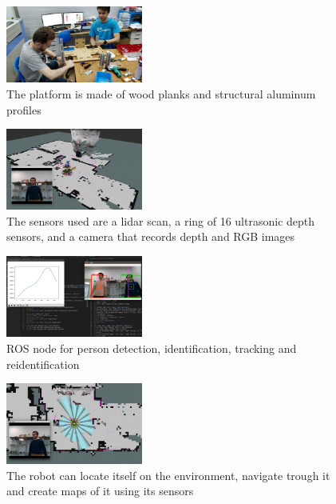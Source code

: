 \setlength\intextsep{0pt}
\begin{figure}
  \centering
  \includegraphics[width=0.4\textwidth]{images/ensambling_the_motor_platform.jpg}
  \caption{The platform is made of wood planks and structural aluminum profiles}
  \label{fig:ensambling_the_motor_platform}
\end{figure}

\setlength\intextsep{0pt}
\begin{figure}
  \centering
  \includegraphics[width=0.4\textwidth]{images/rviz_camera.png}
  \caption{The sensors used are a lidar scan, a ring of 16 ultrasonic depth sensors, and a camera that records depth and RGB images}
  \label{fig:rviz_camera}
\end{figure}

\setlength\intextsep{0pt}
\begin{figure}
  \centering
  \includegraphics[width=0.4\textwidth]{images/rviz_persosns.png}
  \caption{ROS node for person detection, identification, tracking and reidentification}
  \label{fig:rviz_persosns}
\end{figure}

\setlength\intextsep{0pt}
\begin{figure}
  \centering
  \includegraphics[width=0.4\textwidth]{images/rviz_sensors.png}
  \caption{The robot can locate itself on the environment, navigate trough it and create maps of it using its sensors}
  \label{fig:rviz_sensors}
\end{figure}

